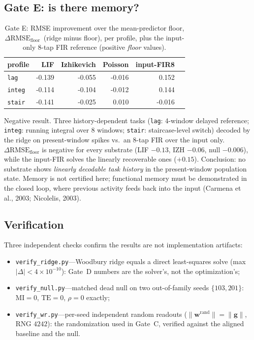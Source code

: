 \documentclass[12pt]{article}
\begin{document}
\subsection{Gate E: is there memory?}\label{sec:gateeres}
\begin{table}[H]
\centering
\caption{Gate E: RMSE improvement over the mean-predictor floor,
$\Delta\mathrm{RMSE}_{\mathrm{floor}}$\ (ridge minus floor), per profile, plus the input-only
8-tap FIR reference (positive \emph{floor} values).}
\label{tab:gatee}
\begin{tabular}{lrrrrr}
\toprule
profile & LIF & Izhikevich & Poisson & input-FIR8 \\
\midrule
\texttt{lag} & -0.139 & -0.055 & -0.016 & 0.152 \\
\texttt{integ} & -0.114 & -0.104 & -0.012 & 0.144 \\
\texttt{stair} & -0.141 & -0.025 & 0.010 & -0.016 \\
\bottomrule
\end{tabular}
\end{table}
Negative result. Three history-dependent tasks (\texttt{lag}:
4-window delayed reference; \texttt{integ}: running integral over
$8$ windows; \texttt{stair}: staircase-level switch) decoded by the
ridge on present-window spikes vs.\ an $8$-tap FIR over the input only.
$\Delta\mathrm{RMSE}_{\mathrm{floor}}$ is negative for every substrate
(LIF $-0.13$, IZH $-0.06$, null $-0.006$), while the input-FIR solves
the linearly recoverable ones ($+0.15$). Conclusion: no substrate shows
\emph{linearly decodable task history} in the present-window population
state. Memory is not certified here; functional memory must be
demonstrated in the closed loop, where previous activity feeds back
into the input (Carmena et al., 2003; Nicolelis, 2003).

\subsection{Verification}\label{sec:verify}
Three independent checks confirm the results are not implementation
artifacts:
\begin{itemize}[nosep]
\item \texttt{verify\_ridge.py}---Woodbury ridge equals a direct
least-squares solve (max $|\Delta|<4\times10^{-10}$): Gate~D numbers
are the solver's, not the optimization's;
\item \texttt{verify\_null.py}---matched dead null on two out-of-family
seeds $\{103,201\}$: $\mathrm{MI}=0$, $\mathrm{TE}=0$, $\rho=0$ exactly;
\item \texttt{verify\_wr.py}---per-seed independent random readouts
($\|\mathbf{w}^{\mathrm{rand}}\|=\|\mathbf{g}\|$, RNG $4242$): the
randomization used in Gate~C, verified against the aligned baseline
and the null.
\end{itemize}
\end{document}
